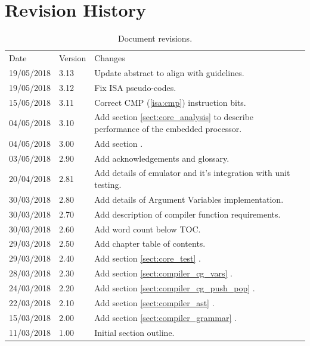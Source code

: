 \documentclass[11pt,a4paper]{report}
\begin{document}
\pagestyle{plain}

\section*{Revision History}
\begin{table}[h]
\def\arraystretch{1.3}
    \begin{tabularx}{\textwidth}{|l|l|X|}
    \hline
    Date & Version & Changes \\
    \arrayrulecolor{blue9}
	\specialrule{2pt}{-2pt}{0pt}
	19/05/2018 & 3.13 & Update abstract to align with guidelines. \\ \hline
	19/05/2018 & 3.12 & Fix ISA pseudo-codes. \\ \hline
	15/05/2018 & 3.11 & Correct CMP (\ref{isa:cmp}) instruction bits. \\ \hline
	04/05/2018 & 3.10 & Add section \ref{sect:core_analysis} {\nameref{sect:core_analysis}} to describe performance of the embedded processor. \\ \hline
	04/05/2018 & 3.00 & Add section {\nameref{sect:preface}}. \\ \hline
	03/05/2018 & 2.90 & Add acknowledgements and glossary. \\ \hline
	20/04/2018 & 2.81 & Add details of emulator and it's integration with unit testing.\\ \hline
	30/03/2018 & 2.80 & Add details of Argument Variables implementation. \\ \hline
	30/03/2018 & 2.70 & Add description of compiler function requirements. \\ \hline
	30/03/2018 & 2.60 & Add word count below TOC. \\ \hline
	29/03/2018 & 2.50 & Add chapter table of contents. \\ \hline
	29/03/2018 & 2.40 & Add section \ref{sect:core_test} \nameref{sect:core_test}. \\ \hline
	28/03/2018 & 2.30 & Add section \ref{sect:compiler_cg_vars} \nameref{sect:compiler_cg_vars}. \\ \hline
	24/03/2018 & 2.20 & Add section \ref{sect:compiler_cg_push_pop} \nameref{sect:compiler_cg_push_pop}. \\ \hline
	22/03/2018 & 2.10 & Add section \ref{sect:compiler_ast} \nameref{sect:compiler_ast}. \\ \hline
	15/03/2018 & 2.00 & Add section \ref{sect:compiler_grammar} \nameref{sect:compiler_grammar}. \\ \hline
	11/03/2018 & 1.00 & Initial section outline. \\ \hline
    \end{tabularx}
    \caption{Document revisions.}
\end{table}
\end{document}
